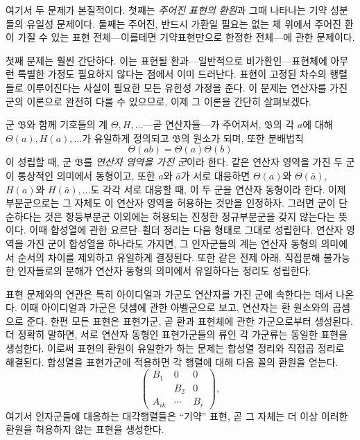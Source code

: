 여기서 두 문제가 본질적이다. 첫째는 \emph{주어진 표현의 환원}과 그때 나타나는 기약 성분들의 유일성 문제이다. 둘째는 주어진, 반드시 가환일 필요는 없는 체 위에서 주어진 환이 가질 수 있는 표현 전체---이를테면 기약표현만으로 한정한 전체---에 관한 문제이다.

첫째 문제는 훨씬 간단하다. 이는 표현될 환과---일반적으로 비가환인---표현체에 아무런 특별한 가정도 필요하지 않다는 점에서 이미 드러난다. 표현이 고정된 차수의 행렬들로 이루어진다는 사실이 필요한 모든 유한성 가정을 준다. 이 문제는 연산자를 가진 군의 이론으로 완전히 다룰 수 있으므로, 이제 그 이론을 간단히 살펴보겠다.

군 $\mathfrak{B}$와 함께 기호들의 계 $\Theta,H,\ldots$---곧 연산자들---가 주어져서, $\mathfrak{B}$의 각 $a$에 대해 $\Theta(a),H(a),\ldots$가 유일하게 정의되고 $\mathfrak{B}$의 원소가 되며, 또한 분배법칙
\[
\Theta(ab)=\Theta(a)\Theta(b)
\]
이 성립할 때, 군 $\mathfrak{B}$를 \emph{연산자 영역을 가진 군}이라 한다. 같은 연산자 영역을 가진 두 군이 통상적인 의미에서 동형이고, 또한 $a$와 $\bar a$가 서로 대응하면 $\Theta(a)$와 $\Theta(\bar a)$, $H(a)$와 $H(\bar a),\ldots$도 각각 서로 대응할 때, 이 두 군을 연산자 동형이라 한다. 이제 부분군으로는 그 자체도 이 연산자 영역을 허용하는 것만을 인정하자. 그러면 군이 단순하다는 것은 항등부분군 이외에는 허용되는 진정한 정규부분군을 갖지 않는다는 뜻이다. 이때 합성열에 관한 요르단--횔더 정리는 다음 형태로 그대로 성립한다. 연산자 영역을 가진 군이 합성열을 하나라도 가지면, 그 인자군들의 계는 연산자 동형의 의미에서 순서의 차이를 제외하고 유일하게 결정된다. 또한 같은 전제 아래, 직접분해 불가능한 인자들로의 분해가 연산자 동형의 의미에서 유일하다는 정리도 성립한다.

표현 문제와의 연관은 특히 아이디얼과 가군도 연산자를 가진 군에 속한다는 데서 나온다. 이때 아이디얼과 가군은 덧셈에 관한 아벨군으로 보고, 연산자는 환 원소와의 곱셈으로 준다. 한편 모든 표현은 표현가군, 곧 환과 표현체에 관한 가군으로부터 생성된다. 더 정확히 말하면, 서로 연산자 동형인 표현가군들의 류인 각 가군류는 동일한 표현을 생성한다. 이로써 표현의 환원이 유일한가 하는 문제는 합성열 정리와 직접곱 정리로 해결된다. 합성열을 표현가군에 적용하면 각 행렬에 대해 다음 꼴의 환원을 얻는다.
\[
\begin{pmatrix}
B_1&0&0\\
&B_2&0\\
A_{ik}&\cdots&B_r
\end{pmatrix},
\]
여기서 인자군들에 대응하는 대각행렬들은 ``기약'' 표현, 곧 그 자체는 더 이상 이러한 환원을 허용하지 않는 표현을 생성한다.

